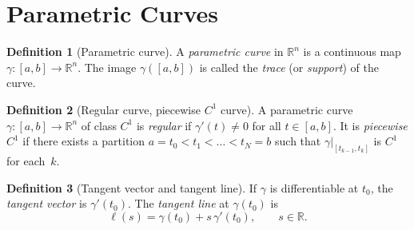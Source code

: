 \documentclass[12pt,a4paper]{book}
\theoremstyle{definition}
\newtheorem{definition}{Definition}[chapter]
\begin{document}
\section{Parametric Curves}
\label{sec:parametric-curves}

\begin{definition}[Parametric curve]\label{def:parametric-curve}
A \emph{parametric curve} in $\mathbb{R}^n$ is a continuous map
$\gamma\colon[a,b]\to\mathbb{R}^n$.  The image $\gamma([a,b])$ is called
the \emph{trace} (or \emph{support}) of the curve.
\end{definition}

\begin{definition}[Regular curve, piecewise $C^1$ curve]\label{def:regular-curve}
A parametric curve $\gamma\colon[a,b]\to\mathbb{R}^n$ of class $C^1$ is
\emph{regular} if $\gamma'(t)\ne 0$ for all $t\in[a,b]$.  It is
\emph{piecewise $C^1$} if there exists a partition
$a=t_0<t_1<\dots<t_N=b$ such that $\gamma|_{[t_{k-1},t_k]}$ is $C^1$ for
each~$k$.
\end{definition}

\begin{definition}[Tangent vector and tangent line]\label{def:tangent-vector}
If $\gamma$ is differentiable at $t_0$, the \emph{tangent vector} is
$\gamma'(t_0)$.  The \emph{tangent line} at $\gamma(t_0)$ is
\[
  \ell(s) = \gamma(t_0) + s\,\gamma'(t_0), \qquad s\in\mathbb{R}.
\]
\end{definition}

\begin{center}
\label{fig:tangent-vectors}
\end{center}
\end{document}
